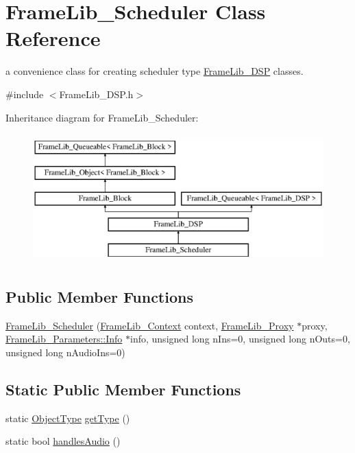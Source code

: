 \hypertarget{class_frame_lib___scheduler}{}\section{Frame\+Lib\+\_\+\+Scheduler Class Reference}
\label{class_frame_lib___scheduler}


a convenience class for creating scheduler type \hyperlink{class_frame_lib___d_s_p}{Frame\+Lib\+\_\+\+D\+SP} classes.  




{\ttfamily \#include $<$Frame\+Lib\+\_\+\+D\+S\+P.\+h$>$}

Inheritance diagram for Frame\+Lib\+\_\+\+Scheduler\+:\begin{figure}[H]
\begin{center}
\leavevmode
\includegraphics[height=5.000000cm]{class_frame_lib___scheduler}
\end{center}
\end{figure}
\subsection*{Public Member Functions}
\begin{DoxyCompactItemize}
\item 
\hyperlink{class_frame_lib___scheduler_a72871bfcfe0243f0477f4abab334dd5a}{Frame\+Lib\+\_\+\+Scheduler} (\hyperlink{class_frame_lib___context}{Frame\+Lib\+\_\+\+Context} context, \hyperlink{struct_frame_lib___proxy}{Frame\+Lib\+\_\+\+Proxy} $\ast$proxy, \hyperlink{class_frame_lib___parameters_1_1_info}{Frame\+Lib\+\_\+\+Parameters\+::\+Info} $\ast$info, unsigned long n\+Ins=0, unsigned long n\+Outs=0, unsigned long n\+Audio\+Ins=0)
\end{DoxyCompactItemize}
\subsection*{Static Public Member Functions}
\begin{DoxyCompactItemize}
\item 
static \hyperlink{_frame_lib___types_8h_a842c5e2e69277690b064bf363c017980}{Object\+Type} \hyperlink{class_frame_lib___scheduler_a7d93c185e4d7b2d13852dad251dc769b}{get\+Type} ()
\item 
static bool \hyperlink{class_frame_lib___scheduler_a6ab661f5a92b9cc0096af2cde6c6f513}{handles\+Audio} ()
\end{DoxyCompactItemize}
